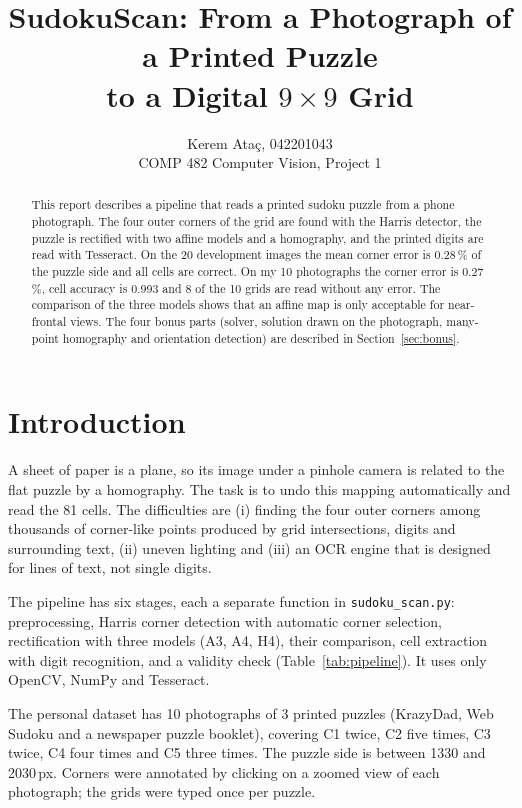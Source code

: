 \documentclass[conference]{IEEEtran}
\begin{document}
\title{SudokuScan: From a Photograph of a Printed Puzzle\\to a Digital $9\times 9$ Grid}
\author{Kerem Ata\c{c}, 042201043\\COMP 482 Computer Vision, Project 1}
\maketitle

\begin{abstract}
This report describes a pipeline that reads a printed sudoku puzzle from a
phone photograph. The four outer corners of the grid are found with the
Harris detector, the puzzle is rectified with two affine models and a
homography, and the printed digits are read with Tesseract. On the 20
development images the mean corner error is 0.28\,\% of the puzzle side and
all cells are correct. On my 10 photographs the corner error is 0.27\,\%,
cell accuracy is 0.993 and 8 of the 10 grids are read without any error. The
comparison of the three models shows that an affine map is only acceptable
for near-frontal views. The four bonus parts (solver, solution drawn on the
photograph, many-point homography and orientation detection) are described
in Section~\ref{sec:bonus}.
\end{abstract}

\section{Introduction}
A sheet of paper is a plane, so its image under a pinhole camera is related
to the flat puzzle by a homography. The task is to undo this mapping
automatically and read the 81 cells. The difficulties are (i) finding the
four outer corners among thousands of corner-like points produced by grid
intersections, digits and surrounding text, (ii) uneven lighting and
(iii) an OCR engine that is designed for lines of text, not single digits.

The pipeline has six stages, each a separate function in
\texttt{sudoku\_scan.py}: preprocessing, Harris corner detection with
automatic corner selection, rectification with three models (A3, A4, H4),
their comparison, cell extraction with digit recognition, and a validity
check (Table~\ref{tab:pipeline}). It uses only OpenCV, NumPy and Tesseract.


The personal dataset has 10 photographs of 3 printed puzzles (KrazyDad, Web
Sudoku and a newspaper puzzle booklet), covering C1 twice, C2 five times, C3
twice, C4 four times and C5 three times. The puzzle side is between 1330 and
2030\,px. Corners were annotated by clicking on a zoomed view of each
photograph; the grids were typed once per puzzle.
\end{document}
